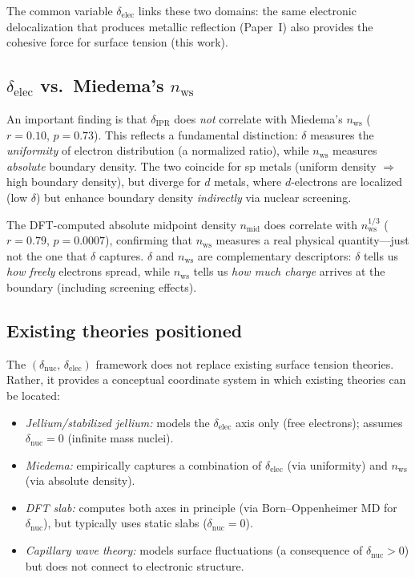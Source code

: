 \documentclass[twocolumn,showpacs,preprintnumbers,amsmath,amssymb,prb]{revtex4-2}
\begin{document}
The common variable $\delta_\mathrm{elec}$ links
these two domains: the same electronic delocalization
that produces metallic reflection (Paper~I) also
provides the cohesive force for surface tension (this work).

\subsection{$\delta_\mathrm{elec}$ vs.\ Miedema's $n_\mathrm{ws}$}
\label{sec:nws_discussion}

An important finding is that $\delta_\mathrm{IPR}$ does
\emph{not} correlate with Miedema's $n_\mathrm{ws}$
($r = 0.10$, $p = 0.73$).
This reflects a fundamental distinction:
$\delta$ measures the \emph{uniformity} of electron
distribution (a normalized ratio), while $n_\mathrm{ws}$
measures \emph{absolute} boundary density.
The two coincide for sp metals (uniform density $\Rightarrow$
high boundary density), but diverge for $d$ metals,
where $d$-electrons are localized (low $\delta$) but
enhance boundary density \emph{indirectly} via nuclear
screening.

The DFT-computed absolute midpoint density $n_\mathrm{mid}$
does correlate with $n_\mathrm{ws}^{1/3}$ ($r = 0.79$,
$p = 0.0007$), confirming that $n_\mathrm{ws}$ measures
a real physical quantity---just not the one that
$\delta$ captures.
$\delta$ and $n_\mathrm{ws}$ are complementary descriptors:
$\delta$ tells us \emph{how freely} electrons spread,
while $n_\mathrm{ws}$ tells us \emph{how much charge}
arrives at the boundary (including screening effects).

\subsection{Existing theories positioned}

The $(\delta_\mathrm{nuc},\,\delta_\mathrm{elec})$ framework
does not replace existing surface tension theories.
Rather, it provides a conceptual coordinate system in which
existing theories can be located:

\begin{itemize}
  \item \emph{Jellium/stabilized jellium:} models the
    $\delta_\mathrm{elec}$ axis only (free electrons);
    assumes $\delta_\mathrm{nuc} = 0$ (infinite mass nuclei).
  \item \emph{Miedema:} empirically captures a combination
    of $\delta_\mathrm{elec}$ (via uniformity) and
    $n_\mathrm{ws}$ (via absolute density).
  \item \emph{DFT slab:} computes both axes in principle
    (via Born--Oppenheimer MD for $\delta_\mathrm{nuc}$),
    but typically uses static slabs
    ($\delta_\mathrm{nuc} = 0$).
  \item \emph{Capillary wave theory:} models surface
    fluctuations (a consequence of $\delta_\mathrm{nuc} > 0$)
    but does not connect to electronic structure.
\end{itemize}
\end{document}
